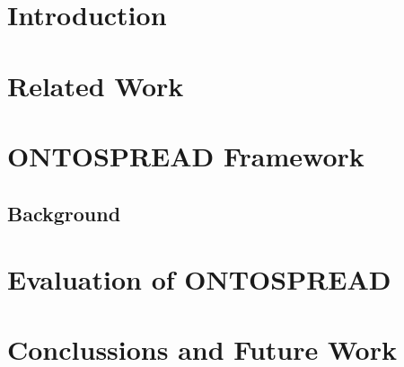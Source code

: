 \documentclass{llncs}
\begin{document}
\section{Introduction}

\section{Related Work}\label{related-work}

\section{ONTOSPREAD Framework}
\subsection{Background}\label{background}


\section{Evaluation of ONTOSPREAD}

\section{Conclussions and Future Work}





\end{document}
